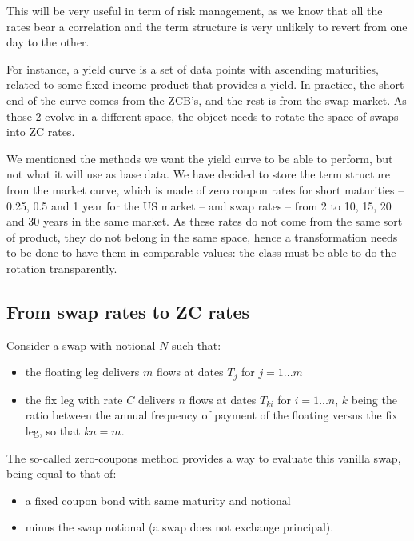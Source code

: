 \par This will be very useful in term of risk management, as we know that all the rates bear a correlation and
the term structure is very unlikely to revert from one day to the other.

\par For instance, a yield curve is a set of data points with ascending maturities, related to some fixed-income product that provides a yield.
In practice, the short end of the curve comes from the ZCB's, and the rest is from the swap market. As those 2 evolve in a different space, the object needs to rotate the space of swaps into ZC rates.

\par We mentioned the methods we want the yield curve to be able to perform, but not what it will use as base data.
We have decided to store the term structure from the market curve, which is made
of zero coupon rates for short maturities -- 0.25, 0.5 and 1 year for the US market --
and swap rates -- from 2 to 10, 15, 20 and 30 years in the same market. As these rates do not come from the same
sort of product, they do not belong in the same space, hence a transformation needs to be done to have them in
comparable values: the class must be able to do the rotation transparently.

\subsection{From swap rates to ZC rates}
\par Consider a swap with notional $N$ such that:
\begin{itemize}
\item the floating leg delivers $m$ flows at dates $T_{j}$ for $j=1...m$
\item the fix leg with rate $C$ delivers $n$ flows at dates
$T_{ki}$ for $i=1...n$, $k$ being the ratio between the annual frequency of payment of the floating versus the fix leg, so that $kn=m$.
\end{itemize}

\par The so-called zero-coupons method provides a way to evaluate this vanilla swap, being equal to that of:
\begin{itemize}
\item a fixed coupon bond with same maturity and notional
\item minus the swap notional (a swap does not exchange principal).
\end{itemize}


